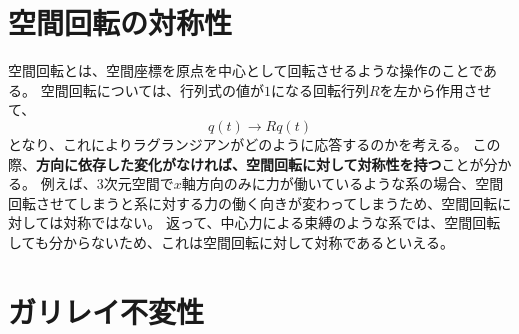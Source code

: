 \documentclass[a4paper]{jsreport}
\begin{document}
        \section{空間回転の対称性}
            空間回転とは、空間座標を原点を中心として回転させるような操作のことである。
            空間回転については、行列式の値が$1$になる回転行列$R$を左から作用させて、
            \begin{equation}
                q(t) \to Rq(t)
            \end{equation}
            となり、これによりラグランジアンがどのように応答するのかを考える。
            この際、\textbf{方向に依存した変化がなければ、空間回転に対して対称性を持つ}ことが分かる。
            例えば、$3$次元空間で$x$軸方向のみに力が働いているような系の場合、空間回転させてしまうと系に対する力の働く向きが変わってしまうため、空間回転に対しては対称ではない。
            返って、中心力による束縛のような系では、空間回転しても分からないため、これは空間回転に対して対称であるといえる。

        \section{ガリレイ不変性}
\end{document}
